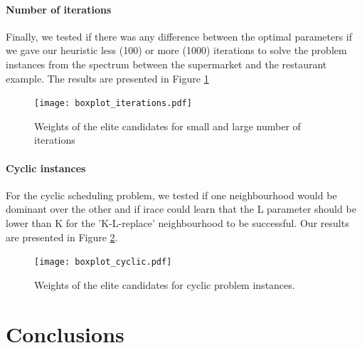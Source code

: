\documentclass[]{article}
\begin{document}
\paragraph{Number of iterations}
Finally, we tested if there was any difference between the optimal parameters if we gave our heuristic less (100) or more (1000) iterations to solve the problem instances from the spectrum between the supermarket and the restaurant example. The results are presented in Figure \ref{fig:iterations}

\begin{figure}
	\texttt{[image: boxplot\_iterations.pdf]}
	\caption{Weights of the elite candidates for small and large number of iterations}
	\label{fig:iterations}
\end{figure}

\paragraph{Cyclic instances}
For the cyclic scheduling problem, we tested if one neighbourhood would be dominant over the other and if irace could learn that the L parameter should be lower than K for the 'K-L-replace' neighbourhood to be successful. Our results are presented in Figure \ref{fig:cyclic}.
\begin{figure}
	\texttt{[image: boxplot\_cyclic.pdf]}
	\caption{Weights of the elite candidates for cyclic problem instances.}
	\label{fig:cyclic}
\end{figure}



\section{Conclusions}




\end{document}
